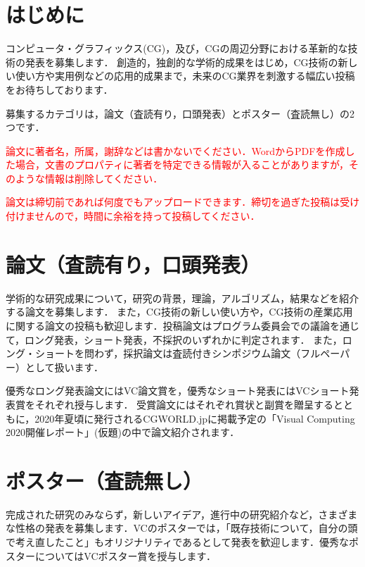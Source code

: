 \documentclass{vc}
\newcommand{\red}[1]{\textcolor{red}{#1}}
\begin{document}

\section{はじめに}
コンピュータ・グラフィックス(CG)，及び，CGの周辺分野における革新的な技術の発表を募集します．
創造的，独創的な学術的成果をはじめ，CG技術の新しい使い方や実用例などの応用的成果まで，未来のCG業界を刺激する幅広い投稿をお待ちしております．

募集するカテゴリは，論文（査読有り，口頭発表）とポスター（査読無し）の2つです．

\red{論文に著者名，所属，謝辞などは書かないでください．WordからPDFを作成した場合，文書のプロパティに著者を特定できる情報が入ることがありますが，そのような情報は削除してください．}

\red{論文は締切前であれば何度でもアップロードできます．締切を過ぎた投稿は受け付けませんので，時間に余裕を持って投稿してください．}


\section{論文（査読有り，口頭発表）}
学術的な研究成果について，研究の背景，理論，アルゴリズム，結果などを紹介する論文を募集します． また，CG技術の新しい使い方や，CG技術の産業応用に関する論文の投稿も歓迎します．投稿論文はプログラム委員会での議論を通じて，ロング発表，ショート発表，不採択のいずれかに判定されます．
また，ロング・ショートを問わず，採択論文は査読付きシンポジウム論文（フルペーパー）として扱います．

優秀なロング発表論文にはVC論文賞を，優秀なショート発表にはVCショート発表賞をそれぞれ授与します． 受賞論文にはそれぞれ賞状と副賞を贈呈するとともに，2020年夏頃に発行されるCGWORLD.jpに掲載予定の「Visual Computing 2020開催レポート」(仮題)の中で論文紹介されます．

\section{ポスター（査読無し）}
完成された研究のみならず，新しいアイデア，進行中の研究紹介など，さまざまな性格の発表を募集します．VCのポスターでは，「既存技術について，自分の頭で考え直したこと」もオリジナリティであるとして発表を歓迎します．優秀なポスターについてはVCポスター賞を授与します．

\small

\nocite{*}

\end{document}
